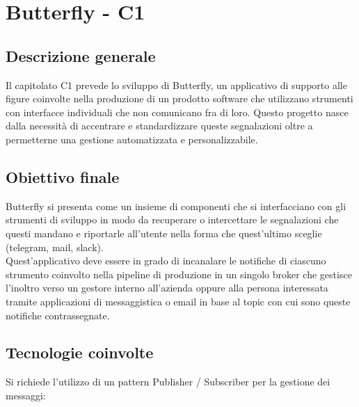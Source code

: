 \section{Butterfly - C1} \label{c1}
    \subsection{Descrizione generale}
	Il capitolato C1 prevede lo sviluppo di Butterfly, un applicativo di supporto alle figure coinvolte nella produzione di un prodotto software che utilizzano strumenti con interfacce individuali che non comunicano fra di loro.
	Questo progetto nasce dalla necessità di accentrare e standardizzare queste segnalazioni oltre a permetterne una gestione automatizzata e personalizzabile.

    \subsection{Obiettivo finale}
    Butterfly si presenta come un insieme di componenti che si interfacciano con gli strumenti di sviluppo in modo da recuperare o intercettare le segnalazioni che questi mandano e riportarle all'utente nella forma che quest'ultimo sceglie (telegram, mail, slack).\\
    Quest'applicativo deve essere in grado di incanalare le notifiche di ciascuno strumento coinvolto nella pipeline di produzione in un singolo broker che gestisce l'inoltro verso un gestore interno all'azienda oppure alla persona interessata tramite applicazioni di messaggistica o email in base al topic con cui sono queste notifiche contrassegnate.

    \subsection{Tecnologie coinvolte}
	Si richiede l'utilizzo di un pattern Publisher / Subscriber per la gestione dei messaggi:

